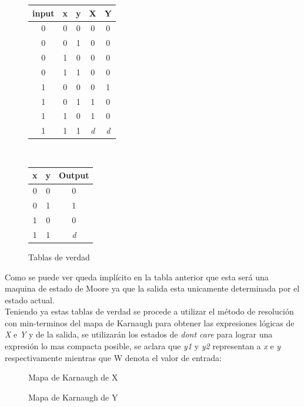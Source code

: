 \begin{figure}[H]
\begin{centering}
\begin{tabular}{|c|c|c||c|c|}
\hline 
input & x & y & X & Y\tabularnewline
\hline 
\hline 
0 & 0 & 0 & 0 & 0\tabularnewline
\hline 
0 & 0 & 1 & 0 & 0\tabularnewline
\hline 
0 & 1 & 0 & 0 & 0\tabularnewline
\hline 
0 & 1 & 1 & 0 & 0\tabularnewline
\hline 
1 & 0 & 0 & 0 & 1\tabularnewline
\hline 
1 & 0 & 1 & 1 & 0\tabularnewline
\hline 
1 & 1 & 0 & 1 & 0\tabularnewline
\hline 
1 & 1 & 1 & \emph{d} & \emph{d}\tabularnewline
\hline 
\end{tabular}\ %
\begin{tabular}{|c|c||c|}
\hline 
x & y & Output\tabularnewline
\hline 
\hline 
0 & 0 & 0\tabularnewline
\hline 
0 & 1 & 1\tabularnewline
\hline 
1 & 0 & 0\tabularnewline
\hline 
1 & 1 & \emph{d}\tabularnewline
\hline 
\end{tabular}
\par\end{centering}
\caption{Tablas de verdad}

\end{figure}

Como se puede ver queda implícito en la tabla anterior que esta será una maquina de estado de Moore ya que la salida esta unicamente determinada por el estado actual.\\

Teniendo ya estas tablas de verdad se procede a utilizar el método de resolución con min-terminos del mapa de Karnaugh para obtener las expresiones lógicas de \emph{X} e \emph{Y} y de la salida, se
utilizarán los estados de \emph{don\textasciiacute t care} para lograr una expresión lo mas compacta posible, se aclara que \emph{y1} y \emph{y2} representan a \emph{x} e \emph{y} respectivamente mientras que W denota el valor de entrada:\\

\begin{figure}[H]
	\centering
	\begin{Karnaughvi}
	\end{Karnaughvi}
\caption{Mapa de Karnaugh de X}
\end{figure}

\begin{figure}[H]
\centering
	\begin{Karnaughvi}
		\contingut{0,0,0,X,1,0,0,X}
		\implicant{4}{4}{red}
	\end{Karnaughvi}
\caption{Mapa de Karnaugh de Y}
\end{figure}

